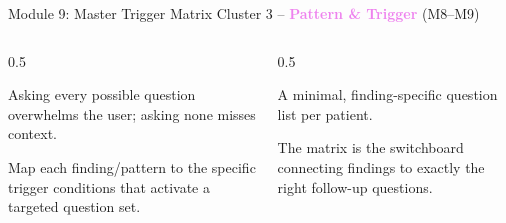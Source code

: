 \documentclass[9pt,aspectratio=169]{beamer}
\begin{document}
\begin{frame}{Module 9: Master Trigger Matrix}
\textcolor{black!55}{\scriptsize Cluster 3 -- \textcolor{violet}{\textbf{Pattern \& Trigger}} (M8--M9)}\\[2pt]
\begin{columns}[T,onlytextwidth]
\begin{column}{0.5\textwidth}
\begin{tcolorbox}[colback=blue!7,colframe=blue!55!black,title=\textbf{Motivation},boxrule=0.6pt,arc=1mm,left=5pt,right=5pt,top=3pt,bottom=3pt,fonttitle=\small]
\footnotesize Asking every possible question overwhelms the user; asking none misses context.
\end{tcolorbox}
\vspace{5pt}
\begin{tcolorbox}[colback=teal!7,colframe=teal!55!black,title=\textbf{Method},boxrule=0.6pt,arc=1mm,left=5pt,right=5pt,top=3pt,bottom=3pt,fonttitle=\small]
\footnotesize Map each finding/pattern to the specific trigger conditions that activate a targeted question set.
\end{tcolorbox}
\end{column}
\begin{column}{0.5\textwidth}
\begin{tcolorbox}[colback=green!8,colframe=green!45!black,title=\textbf{Result},boxrule=0.6pt,arc=1mm,left=5pt,right=5pt,top=3pt,bottom=3pt,fonttitle=\small]
\footnotesize A minimal, finding-specific question list per patient.
\end{tcolorbox}
\vspace{5pt}
\begin{tcolorbox}[colback=orange!10,colframe=orange!65!black,title=\textbf{Conclusion},boxrule=0.6pt,arc=1mm,left=5pt,right=5pt,top=3pt,bottom=3pt,fonttitle=\small]
\footnotesize The matrix is the switchboard connecting findings to exactly the right follow-up questions.
\end{tcolorbox}
\end{column}
\end{columns}
\end{frame}
\end{document}
